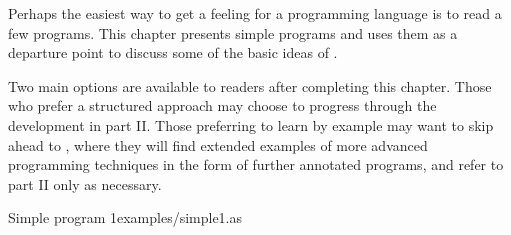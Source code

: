 

Perhaps the easiest way to get a feeling for a programming language is
to read a few programs.  This chapter presents simple programs
and uses them as a departure point to discuss some of the basic ideas
of \asharp{}.

Two main options are available to readers after completing this
chapter.  Those who prefer a structured approach may choose to
progress through the development in part II.  Those preferring to
learn by example may want to skip ahead to ,
where they will find extended examples of more advanced
programming techniques in the form of further annotated programs,
and refer to part II only as necessary.

{}
{Simple program 1}{examples/simple1.as}

